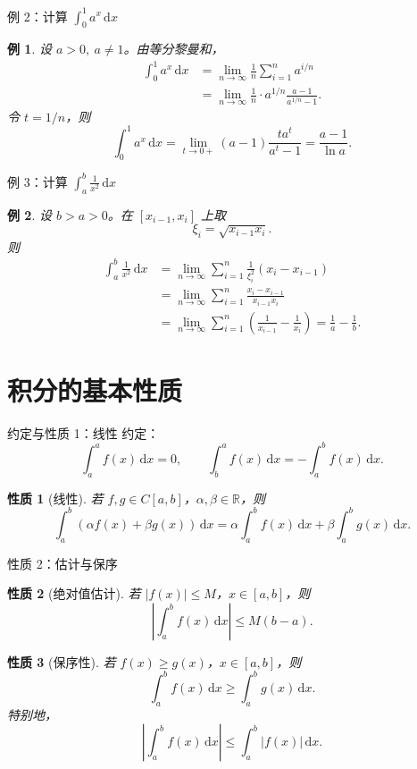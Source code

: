﻿\documentclass[aspectratio=169,11pt]{ctexbeamer}
\newtheorem{myprop}{性质}
\newtheorem{myex}{例}
\newcommand{\dd}{\,\mathrm{d}}
\newcommand{\abs}[1]{\left|#1\right|}
\newcommand{\R}{\mathbb{R}}
\begin{document}
\begin{frame}{例 2：计算 $\int_0^1 a^x\dd x$}
  \begin{myex}
  设 $a>0,\ a\ne1$。由等分黎曼和，
  \[
  \begin{aligned}
    \int_0^1 a^x\dd x
    &=\lim_{n\to\infty}\frac1n\sum_{i=1}^{n}a^{i/n}\\
    &=\lim_{n\to\infty}\frac1n\cdot
      a^{1/n}\frac{a-1}{a^{1/n}-1}.
  \end{aligned}
  \]
  令 $t=1/n$，则
  \[
    \int_0^1 a^x\dd x
    =\lim_{t\to0+}(a-1)\frac{t a^t}{a^t-1}
    =\frac{a-1}{\ln a}.
  \]
  \end{myex}
\end{frame}

\begin{frame}{例 3：计算 $\int_a^b\frac1{x^2}\dd x$}
  \begin{myex}
  设 $b>a>0$。在 $[x_{i-1},x_i]$ 上取
  \[
    \xi_i=\sqrt{x_{i-1}x_i}.
  \]
  则
  \[
  \begin{aligned}
    \int_a^b\frac1{x^2}\dd x
    &=\lim_{n\to\infty}\sum_{i=1}^{n}
      \frac1{\xi_i^2}(x_i-x_{i-1})\\
    &=\lim_{n\to\infty}\sum_{i=1}^{n}
      \frac{x_i-x_{i-1}}{x_{i-1}x_i}\\
    &=\lim_{n\to\infty}\sum_{i=1}^{n}
      \left(\frac1{x_{i-1}}-\frac1{x_i}\right)
      =\frac1a-\frac1b.
  \end{aligned}
  \]
  \end{myex}
\end{frame}

\section{积分的基本性质}

\begin{frame}{约定与性质 1：线性}
  约定：
  \[
    \int_a^a f(x)\dd x=0,\qquad
    \int_b^a f(x)\dd x=-\int_a^b f(x)\dd x.
  \]

  \begin{myprop}[线性]
  若 $f,g\in C[a,b]$，$\alpha,\beta\in\R$，则
  \[
    \int_a^b(\alpha f(x)+\beta g(x))\dd x
    =\alpha\int_a^b f(x)\dd x
    +\beta\int_a^b g(x)\dd x.
  \]
  \end{myprop}
\end{frame}

\begin{frame}[allowframebreaks]{性质 2：估计与保序}
  \small
  \begin{myprop}[绝对值估计]
  若 $\abs{f(x)}\le M$，$x\in[a,b]$，则
  \[
    \abs{\int_a^b f(x)\dd x}\le M(b-a).
  \]
  \end{myprop}

  \begin{myprop}[保序性]
  若 $f(x)\ge g(x)$，$x\in[a,b]$，则
  \[
    \int_a^b f(x)\dd x\ge\int_a^b g(x)\dd x.
  \]
  特别地，
  \[
    \abs{\int_a^b f(x)\dd x}\le\int_a^b\abs{f(x)}\dd x.
  \]
  \end{myprop}
\end{frame}
\end{document}
